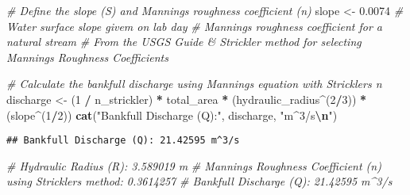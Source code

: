 \documentclass[
]{article}
\newenvironment{Shaded}{\begin{snugshade}}{\end{snugshade}}
\newcommand{\CommentTok}[1]{\textcolor[rgb]{0.56,0.35,0.01}{\textit{#1}}}
\newcommand{\DecValTok}[1]{\textcolor[rgb]{0.00,0.00,0.81}{#1}}
\newcommand{\FloatTok}[1]{\textcolor[rgb]{0.00,0.00,0.81}{#1}}
\newcommand{\FunctionTok}[1]{\textcolor[rgb]{0.13,0.29,0.53}{\textbf{#1}}}
\newcommand{\NormalTok}[1]{#1}
\newcommand{\OtherTok}[1]{\textcolor[rgb]{0.56,0.35,0.01}{#1}}
\newcommand{\SpecialCharTok}[1]{\textcolor[rgb]{0.81,0.36,0.00}{\textbf{#1}}}
\newcommand{\StringTok}[1]{\textcolor[rgb]{0.31,0.60,0.02}{#1}}
\begin{document}
\begin{Shaded}
\begin{Highlighting}[]
\CommentTok{\# Define the slope (S) and Manning\textquotesingle{}s roughness coefficient (n)}
\NormalTok{slope }\OtherTok{\textless{}{-}} \FloatTok{0.0074}  \CommentTok{\# Water surface slope givem on lab day}
                  \CommentTok{\# Manning\textquotesingle{}s roughness coefficient for a natural stream}
                  \CommentTok{\# From the USGS Guide \& Strickler method for selecting Manning\textquotesingle{}s Roughness Coefficients}

\CommentTok{\# Calculate the bankfull discharge using Manning\textquotesingle{}s equation with Strickler\textquotesingle{}s n}
\NormalTok{discharge }\OtherTok{\textless{}{-}}\NormalTok{ (}\DecValTok{1} \SpecialCharTok{/}\NormalTok{ n\_strickler) }\SpecialCharTok{*}\NormalTok{ total\_area }\SpecialCharTok{*}\NormalTok{ (hydraulic\_radius}\SpecialCharTok{\^{}}\NormalTok{(}\DecValTok{2}\SpecialCharTok{/}\DecValTok{3}\NormalTok{)) }\SpecialCharTok{*}\NormalTok{ (slope}\SpecialCharTok{\^{}}\NormalTok{(}\DecValTok{1}\SpecialCharTok{/}\DecValTok{2}\NormalTok{))}
\FunctionTok{cat}\NormalTok{(}\StringTok{"Bankfull Discharge (Q):"}\NormalTok{, discharge, }\StringTok{"m\^{}3/s}\SpecialCharTok{\textbackslash{}n}\StringTok{"}\NormalTok{)}
\end{Highlighting}
\end{Shaded}

\begin{verbatim}
## Bankfull Discharge (Q): 21.42595 m^3/s
\end{verbatim}

\begin{Shaded}
\begin{Highlighting}[]
\CommentTok{\# Hydraulic Radius (R): 3.589019 m}
\CommentTok{\# Manning\textquotesingle{}s Roughness Coefficient (n) using Strickler\textquotesingle{}s method: 0.3614257 }
\CommentTok{\# Bankfull Discharge (Q): 21.42595 m\^{}3/s}
\end{Highlighting}
\end{Shaded}
\end{document}
